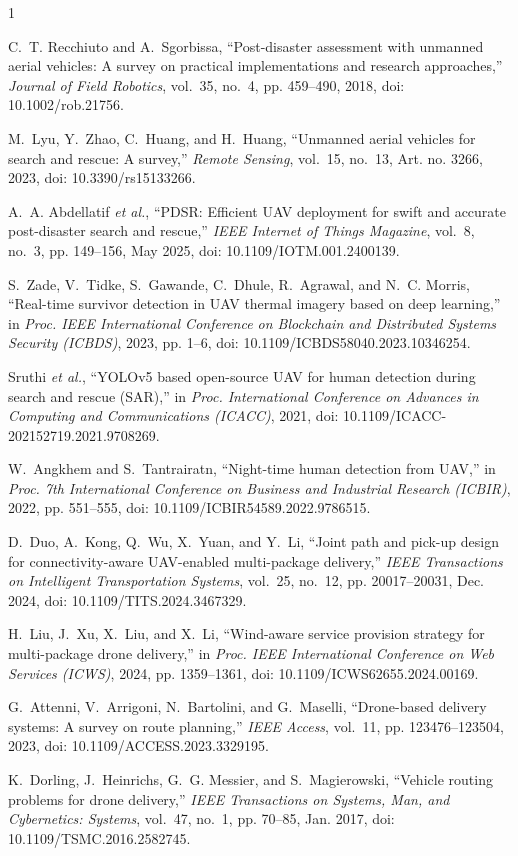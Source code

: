 \documentclass[conference]{IEEEtran}
\begin{document}
\begin{thebibliography}{1}

C.~T. Recchiuto and A.~Sgorbissa, ``Post-disaster assessment with unmanned aerial vehicles: A survey on practical implementations and research approaches,'' \emph{Journal of Field Robotics}, vol.~35, no.~4, pp. 459--490, 2018, doi: 10.1002/rob.21756.

M.~Lyu, Y.~Zhao, C.~Huang, and H.~Huang, ``Unmanned aerial vehicles for search and rescue: A survey,'' \emph{Remote Sensing}, vol.~15, no.~13, Art. no. 3266, 2023, doi: 10.3390/rs15133266.

A.~A. Abdellatif \emph{et al.}, ``PDSR: Efficient UAV deployment for swift and accurate post-disaster search and rescue,'' \emph{IEEE Internet of Things Magazine}, vol.~8, no.~3, pp. 149--156, May 2025, doi: 10.1109/IOTM.001.2400139.

S.~Zade, V.~Tidke, S.~Gawande, C.~Dhule, R.~Agrawal, and N.~C. Morris, ``Real-time survivor detection in UAV thermal imagery based on deep learning,'' in \emph{Proc. IEEE International Conference on Blockchain and Distributed Systems Security (ICBDS)}, 2023, pp. 1--6, doi: 10.1109/ICBDS58040.2023.10346254.

Sruthi \emph{et al.}, ``YOLOv5 based open-source UAV for human detection during search and rescue (SAR),'' in \emph{Proc. International Conference on Advances in Computing and Communications (ICACC)}, 2021, doi: 10.1109/ICACC-202152719.2021.9708269.

W.~Angkhem and S.~Tantrairatn, ``Night-time human detection from UAV,'' in \emph{Proc. 7th International Conference on Business and Industrial Research (ICBIR)}, 2022, pp. 551--555, doi: 10.1109/ICBIR54589.2022.9786515.

D.~Duo, A.~Kong, Q.~Wu, X.~Yuan, and Y.~Li, ``Joint path and pick-up design for connectivity-aware UAV-enabled multi-package delivery,'' \emph{IEEE Transactions on Intelligent Transportation Systems}, vol.~25, no.~12, pp. 20017--20031, Dec. 2024, doi: 10.1109/TITS.2024.3467329.

H.~Liu, J.~Xu, X.~Liu, and X.~Li, ``Wind-aware service provision strategy for multi-package drone delivery,'' in \emph{Proc. IEEE International Conference on Web Services (ICWS)}, 2024, pp. 1359--1361, doi: 10.1109/ICWS62655.2024.00169.

G.~Attenni, V.~Arrigoni, N.~Bartolini, and G.~Maselli, ``Drone-based delivery systems: A survey on route planning,'' \emph{IEEE Access}, vol.~11, pp. 123476--123504, 2023, doi: 10.1109/ACCESS.2023.3329195.

K.~Dorling, J.~Heinrichs, G.~G. Messier, and S.~Magierowski, ``Vehicle routing problems for drone delivery,'' \emph{IEEE Transactions on Systems, Man, and Cybernetics: Systems}, vol.~47, no.~1, pp. 70--85, Jan. 2017, doi: 10.1109/TSMC.2016.2582745.

\end{thebibliography}
\end{document}
